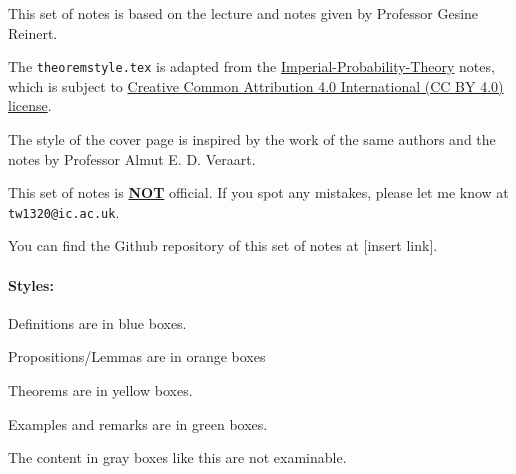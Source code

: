 \thispagestyle{empty}
This set of notes is based on the lecture and notes given by Professor Gesine Reinert.

The \verb|theoremstyle.tex| is adapted from the \href{https://github.com/Samuel-CHLam/Imperial-Probability-Theory}{Imperial-Probability-Theory} notes, which is subject to \href{https://github.com/Samuel-CHLam/Imperial-Probability-Theory#license}{Creative Common Attribution 4.0 International (CC BY 4.0) license}.  

The style of the cover page is inspired by the work of the same authors and the notes by Professor Almut E. D. Veraart.


This set of notes is \underline{\bf NOT} official. If you spot any mistakes, please let me know at \verb|tw1320@ic.ac.uk|.

You can find the Github repository of this set of notes at [insert link].

\paragraph{Styles:}

\begin{definition}
    Definitions are in blue boxes.
\end{definition}

\begin{proposition}
    Propositions/Lemmas are in orange boxes
\end{proposition}
\begin{theorem}
    Theorems are in yellow boxes.
\end{theorem}

\begin{example}
    Examples and remarks are in green boxes. 
\end{example}

\begin{unexaminable}
    The content in gray boxes like this are not examinable.
\end{unexaminable}  
 



